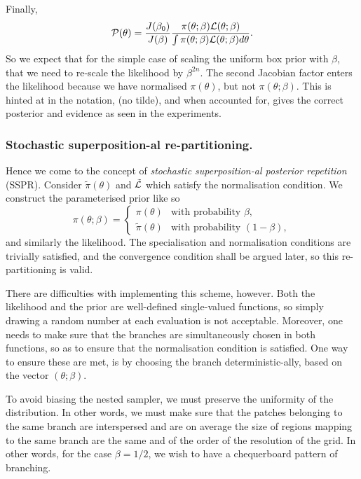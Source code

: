 \documentclass[usenatbib]{mnras}
\begin{document}
Finally, 
\begin{equation}
 {\cal P}(\theta) = \frac{J(\beta_{0})}{J(\beta)} \frac{\pi(\theta; \beta) {\cal L}(\theta; \beta)}{\int \pi(\theta; \beta) {\cal L}(\theta; \beta) d \theta}.
\end{equation}
So we expect that for the simple case of scaling the uniform box
prior with \(\beta\), that we need to re-scale the likelihood by
\(\beta^{2n}\). The second Jacobian factor enters the likelihood because
we have normalised \(\pi(\theta)\), but not \(\pi(\theta; \beta)\). This is hinted at in
the notation, (no tilde), and when accounted for, gives  the correct
posterior and evidence as seen in the experiments. 


\subsubsection{Stochastic superposition-al re-partitioning.}
\label{sec:org6736c16}

Hence we come to the concept of \emph{stochastic superposition-al
posterior repetition} (SSPR). Consider \(\tilde{\pi}(\theta)\) and
\({\cal \tilde{L}}\) which satisfy the normalisation
condition. We construct the parameterised prior like so
\begin{equation}
  \pi(\theta; \beta)  = \begin{cases}
	\pi(\theta) & \text{with probability } \beta,\\
	\tilde{\pi}(\theta) & \text{with probability } (1- \beta),
	\end{cases}
\end{equation}
and similarly the likelihood.  The specialisation and
normalisation conditions are trivially satisfied, and the
convergence condition shall be argued later, so this
re-partitioning is valid.

There are difficulties with implementing this scheme,
however. Both the likelihood and the prior are well-defined
single-valued functions, so simply drawing a random number at each
evaluation is not acceptable. Moreover, one needs to make sure
that the branches are simultaneously chosen in both functions, so
as to ensure that the normalisation condition is satisfied. One
way to ensure these are met, is by choosing the branch
deterministic-ally, based on the vector \((\theta; \beta)\). 

To avoid biasing the nested sampler, we must preserve the
uniformity of the distribution. In other words, we must make sure
that the patches belonging to the same branch are interspersed and
are on average the size of regions mapping to the same branch are
the same and of the order of the resolution of the grid. In other
words, for the case \(\beta=1/2\), we wish to have a chequerboard
pattern of branching. 
\end{document}
